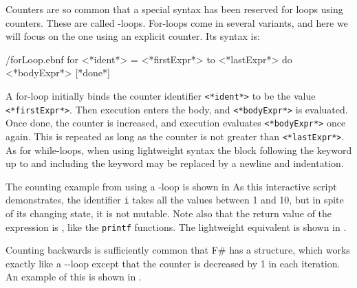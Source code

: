 \documentclass[fsharpNotes.tex]{subfiles}
\begin{document}
Counters are so common that a special syntax has been reserved for loops using counters. These are called -loops. For-loops come in several variants, and here we will focus on the one using an explicit counter. Its syntax is:
%
\begin{verbatimwrite}{\ebnf/forLoop.ebnf}
for <*ident*> = <*firstExpr*> to <*lastExpr*> do <*bodyExpr*> [*done*]
\end{verbatimwrite}
%
A for-loop initially binds the counter identifier \lstinline[language=syntax]{<*ident*>} to be the value \lstinline[language=syntax]{<*firstExpr*>}. Then execution enters the body, and \lstinline[language=syntax]{<*bodyExpr*>} is evaluated. Once done, the counter is increased, and execution evaluates \lstinline[language=syntax]{<*bodyExpr*>}  once again. This is repeated as long as the counter is not greater than \lstinline[language=syntax]{<*lastExpr*>}. As for while-loops, when using lightweight syntax the block following the  keyword up to and including the  keyword may be replaced by a newline and indentation.

The counting example from  using a -loop is shown in 
%
%
As this interactive script demonstrates, the identifier \lstinline!i! takes all the values between 1 and 10, but in spite of its changing state, it is not mutable. Note also that the return value of the  expression is \lexeme{()}, like the \lstinline!printf! functions. The lightweight equivalent is shown in .
%
%

Counting backwards is sufficiently common that F\# has a  structure, which works exactly like a --loop except that the counter is decreased by 1 in each iteration. An example of this is shown in .
%
%
\end{document}
